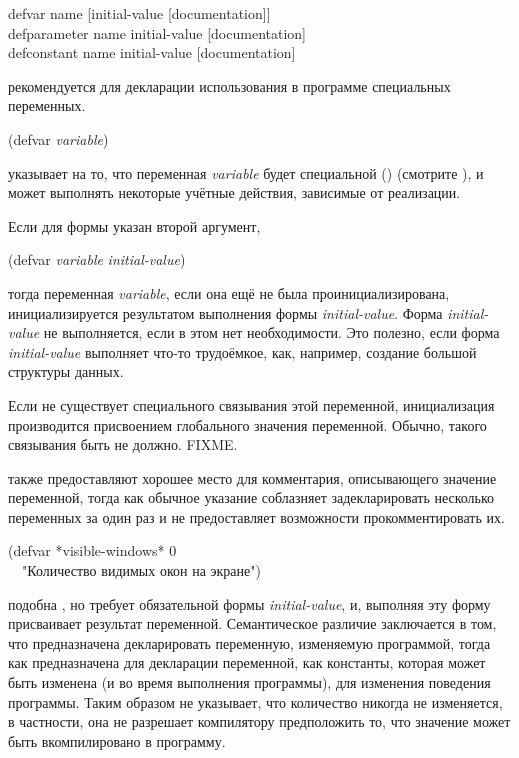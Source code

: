 \begin{defmac}
defvar name [initial-value [documentation]] \\
defparameter name initial-value [documentation] \\
defconstant name initial-value [documentation]

 рекомендуется для декларации использования в программе специальных
переменных.
\begin{lisp}
(defvar \emph{variable})
\end{lisp}
указывает на то, что переменная \emph{variable} будет специальной
() (смотрите ), и может выполнять некоторые учётные
действия, зависимые от реализации.

Если для формы указан второй аргумент,
\begin{lisp}
(defvar \emph{variable} \emph{initial-value})
\end{lisp}
тогда переменная \emph{variable}, если она ещё не была проинициализирована,
инициализируется результатом выполнения формы \emph{initial-value}. Форма
\emph{initial-value} не выполняется, если в этом нет необходимости. Это
полезно, если форма \emph{initial-value} выполняет что-то
трудоёмкое, как, например, создание большой структуры данных.

Если не существует специального связывания этой переменной, инициализация
производится присвоением глобального значения переменной. 
Обычно, такого связывания быть не должно. FIXME.

 также предоставляют хорошее место для комментария, описывающего
значение переменной, тогда как обычное  указание соблазняет
задекларировать несколько переменных за один раз и не предоставляет возможности
прокомментировать их.
\begin{lisp}
(defvar *visible-windows* 0 \\
~~"Количество видимых окон на экране")
\end{lisp}

 подобна , но  требует
обязательной формы \emph{initial-value}, и, выполняя эту форму присваивает
результат переменной. Семантическое различие заключается в том, что 
 предназначена декларировать переменную, изменяемую программой,
тогда как  предназначена для декларации переменной, как
константы, которая может быть изменена (и во время выполнения программы), для
изменения поведения программы. Таким образом  не указывает,
что количество никогда не изменяется, в частности, она не разрешает 
компилятору предположить то, что значение может быть вкомпилировано в
программу.


\end{defmac}
